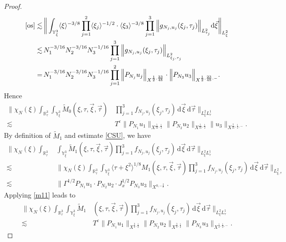 \documentclass[reqno]{amsart}
\theoremstyle{Definitionl}
\theoremstyle{Definitionk}
\theoremstyle{definition}
\theoremstyle{Satzk}
\theoremstyle{Satzl}
\theoremstyle{Bemerkung}
\begin{document}
\begin{proof}
\begin{align}
\eqref{os}\lesssim&\,\bigg\|\int_{\mathbb Y^3_\xi}\langle\xi\rangle^{-3/8}\prod_{j=1}^2\langle\xi_j\rangle^{-1/2}\cdot\langle\xi_3\rangle^{-3/8}\prod_{j=1}^3\Big\|g_{N_j,u_j}(\xi_j,\tau_j)\Big\|_{L^2_{\tau_j}}\mathrm d\vec\xi\bigg\|_{L^2_\xi}\nonumber\\
\lesssim&\, N_1^{-3/16} N_2^{-3/16} N_3^{-1/16}\prod_{j=1}^3
\Big\|g_{N_j,u_j}(\xi_j,\tau_j)\Big\|_{L^2_{\xi_j,\tau_j}}\nonumber\\
=&\, N_1^{-3/16} N_2^{-3/16} N_3^{-1/16}\prod_{j=1}^2\Big\|P_{N_j}u_j\Big\|_{X^{\frac12,\frac{23}{48}}}\cdot\Big\|P_{N_3}u_3\Big\|_{X^{\frac12,\frac{23}{48},-}}.\nonumber
\end{align}
Hence
\begin{align}
\Big\|\chi_N(\xi)\int_{\mathbb R^3_\tau}\int_{\mathbb Y^3_\xi}\tilde M_0(\xi,\tau,\vec\xi,\vec\tau)&\,\prod_{j=1}^3f_{N_j,u_j}(\xi_j,\tau_j)\,\mathrm d\vec\xi\,\mathrm d\vec\tau\Big\|_{L^2_{\xi}L^1_\tau}\nonumber\\
\lesssim&\, T^\varepsilon \|P_{N_1}u_1\|_{X^{\frac{5}{16},\frac{1}{2}}}\|P_{N_2}u_2\|_{X^{\frac{5}{16},\frac{1}{2}}}\|u_3\|_{X^{\frac{7}{16},\frac{1}{2},-}}.\label{tM0}
\end{align}
By definition of $\tilde M_1$ and estimate \eqref{CSU}, we have
\begin{align*}
\bigg\|\chi_N(\xi)\int_{\mathbb R^3_\tau}&\,\int_{\mathbb Y^3_\xi}\tilde M_1(\xi,\tau,\vec\xi,\vec\tau)\prod_{j=1}^3f_{N_j,u_j}(\xi_j,\tau_j)\,\mathrm d\vec\xi\,\mathrm d\vec\tau\bigg\|_{L^2_\xi L^1_\tau}\nonumber\\
\lesssim&\, \bigg\|\chi_N(\xi)\int_{\mathbb R^3_\tau}\int_{\mathbb Y^3_\xi}\langle\tau+\xi^2\rangle^{1/8} M_1(\xi,\tau,\vec\xi,\vec\tau)\prod_{j=1}^3f_{N_j,u_j}(\xi_j,\tau_j)\,\mathrm d\vec\xi\,\mathrm d\vec\tau\bigg\|_{L^2_{\xi,\tau}}\\
\lesssim&\,\Big\|\Gamma^{1/2}P_{N_1}u_1\cdot{P_{N_2}u_{2}}\cdot J_{x}^{1/2}P_{N_3}u_3\Big\|_{X^{0,-\frac38}}.
\end{align*}
Applying \eqref{m11} leads to
\begin{align}
\Big\|\chi_N(\xi)\int_{\mathbb R^3_\tau}\int_{\mathbb Y^3_\xi}\tilde M_1&\,(\xi,\tau,\vec\xi,\vec\tau)\prod_{j=1}^3f_{N_j,u_j}(\xi_j,\tau_j)\,\mathrm d\vec\xi\,\mathrm d\vec\tau\Big\|_{L^2_{\xi}L^1_\tau}\nonumber\\
\lesssim&\, T^\varepsilon\|P_{N_1}u_1\|_{X^{\frac38,\frac12}}\|P_{N_2}u_2\|_{X^{\frac38,\frac12}}\|P_{N_3}u_3\|_{X^{\frac12,\frac12,-}}.\label{tM1}
\end{align}

\end{proof}
\end{document}
